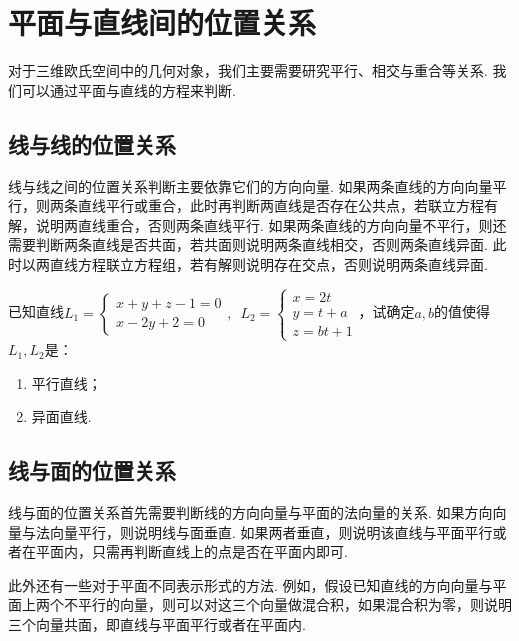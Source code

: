 \section{平面与直线间的位置关系}

对于三维欧氏空间中的几何对象，我们主要需要研究平行、相交与重合等关系. 我们可以通过平面与直线的方程来判断.

\subsection{线与线的位置关系}

线与线之间的位置关系判断主要依靠它们的方向向量. 如果两条直线的方向向量平行，则两条直线平行或重合，此时再判断两直线是否存在公共点，若联立方程有解，说明两直线重合，否则两条直线平行. 如果两条直线的方向向量不平行，则还需要判断两条直线是否共面，若共面则说明两条直线相交，否则两条直线异面. 此时以两直线方程联立方程组，若有解则说明存在交点，否则说明两条直线异面.

\begin{example}
    已知直线$L_1=\begin{cases}
            x+y+z-1=0 \\
            x-2y+2=0
        \end{cases},\enspace L_2=\begin{cases}
            x=2t  \\
            y=t+a \\
            z=bt+1
        \end{cases}$，试确定$a,b$的值使得$L_1,L_2$是：
    \begin{enumerate}
        \item 平行直线；

        \item 异面直线.
    \end{enumerate}
\end{example}

\subsection{线与面的位置关系}

线与面的位置关系首先需要判断线的方向向量与平面的法向量的关系. 如果方向向量与法向量平行，则说明线与面垂直. 如果两者垂直，则说明该直线与平面平行或者在平面内，只需再判断直线上的点是否在平面内即可.

此外还有一些对于平面不同表示形式的方法. 例如，假设已知直线的方向向量与平面上两个不平行的向量，则可以对这三个向量做混合积，如果混合积为零，则说明三个向量共面，即直线与平面平行或者在平面内.

